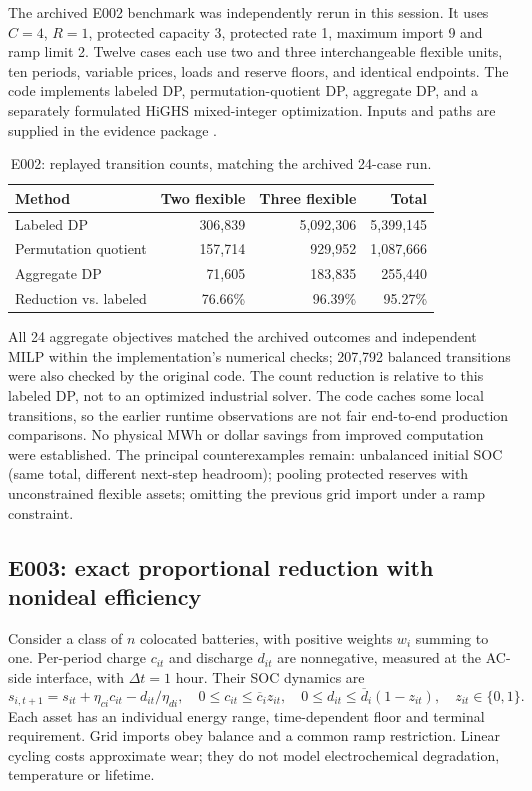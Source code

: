 \documentclass[11pt,letterpaper]{article}
\begin{document}
The archived E002 benchmark was independently rerun in this session. It uses $C=4$, $R=1$, protected capacity 3, protected rate 1, maximum import 9 and ramp limit 2. Twelve cases each use two and three interchangeable flexible units, ten periods, variable prices, loads and reserve floors, and identical endpoints. The code implements labeled DP, permutation-quotient DP, aggregate DP, and a separately formulated HiGHS mixed-integer optimization. Inputs and paths are supplied in the evidence package \cite{evidence}.
\begin{table}[htbp]
\centering\small
\caption{E002: replayed transition counts, matching the archived 24-case run.}
\begin{tabular}{lrrr}
\toprule
Method & Two flexible & Three flexible & Total\\
\midrule
Labeled DP & 306,839 & 5,092,306 & 5,399,145\\
Permutation quotient & 157,714 & 929,952 & 1,087,666\\
Aggregate DP & 71,605 & 183,835 & 255,440\\
\midrule
Reduction vs. labeled & 76.66\% & 96.39\% & 95.27\%\\
\bottomrule
\end{tabular}
\end{table}
All 24 aggregate objectives matched the archived outcomes and independent MILP within the implementation's numerical checks; 207,792 balanced transitions were also checked by the original code. The count reduction is relative to this labeled DP, not to an optimized industrial solver. The code caches some local transitions, so the earlier runtime observations are not fair end-to-end production comparisons. No physical MWh or dollar savings from improved computation were established. The principal counterexamples remain: unbalanced initial SOC (same total, different next-step headroom); pooling protected reserves with unconstrained flexible assets; omitting the previous grid import under a ramp constraint.

\subsection{E003: exact proportional reduction with nonideal efficiency}
\label{sec:e003}
Consider a class of $n$ colocated batteries, with positive weights $w_i$ summing to one. Per-period charge $c_{it}$ and discharge $d_{it}$ are nonnegative, measured at the AC-side interface, with $\Delta t=1$ hour. Their SOC dynamics are
\[
s_{i,t+1}=s_{it}+\eta_{ci}c_{it}-d_{it}/\eta_{di},\quad
0\le c_{it}\le \overline c_i z_{it},\quad
0\le d_{it}\le \overline d_i(1-z_{it}),\quad z_{it}\in\{0,1\}.
\]
Each asset has an individual energy range, time-dependent floor and terminal requirement. Grid imports obey balance and a common ramp restriction. Linear cycling costs approximate wear; they do not model electrochemical degradation, temperature or lifetime.
\end{document}

